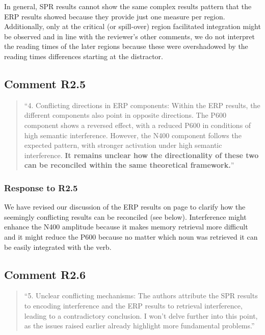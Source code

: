 \documentclass[12pt]{article}
\begin{document}
In general, SPR results cannot show the same complex results pattern that the ERP results showed because they provide just one measure per region. Additionally, only at the critical (or spill-over) region facilitated integration might be observed and in line with the reviewer's other comments, we do not interpret the reading times of the later regions because these were overshadowed by the reading times differences starting at the distractor.

 
\subsection*{Comment R2.5}
\begin{quote}
``4. Conflicting directions in ERP components: Within the ERP results, the different components also point in opposite directions. The P600 component shows a reversed effect, with a reduced P600 in conditions of high semantic interference. However, the N400 component follows the expected pattern, with stronger activation under high semantic interference. \textbf{It remains unclear how the directionality of these two can be reconciled within the same theoretical framework.}''
\end{quote}

\subsubsection*{Response to R2.5}
 
We have revised our discussion of the ERP results on page \pageref{inhibition_facilitation} to clarify how the seemingly conflicting results can be reconciled (see below). Interference might enhance the N400 amplitude because it makes memory retrieval more difficult and it might reduce the P600 because no matter which noun was retrieved it can be easily integrated with the verb.

\begin{quote}
\end{quote}
 
\subsection*{Comment R2.6}
\begin{quote}
``5. Unclear conflicting mechanisms: The authors attribute the SPR results to encoding interference and the ERP results to retrieval interference, leading to a contradictory conclusion. I won't delve further into this point, as the issues raised earlier already highlight more fundamental problems.''
\end{quote}
\end{document}
